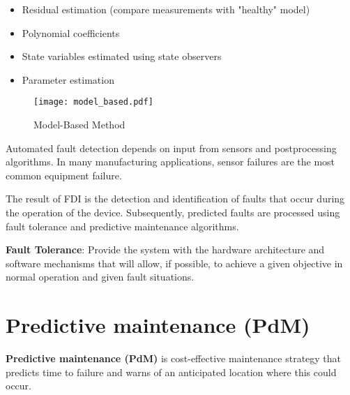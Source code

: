 \begin{itemize}
    \item Residual estimation (compare measurements with "healthy" model)
    \item Polynomial coefficients
    \item State variables estimated using state observers
    \item Parameter estimation
\end{itemize}

\begin{figure}[h!]
    \centering
    \texttt{[image: model\_based.pdf]}
    \caption{Model-Based Method}
    \label{fig:model_based}
\end{figure}


Automated fault detection depends on input from sensors and postprocessing
algorithms. In many manufacturing applications, sensor failures are the
most common equipment failure.


The result of FDI is the detection and identification of faults that occur
during the operation of the device. Subsequently, predicted faults are
processed using fault tolerance and predictive maintenance algorithms.

\textbf{Fault Tolerance}: Provide the system with the hardware architecture
and software mechanisms that will allow, if possible, to achieve a given
objective in normal operation and given fault situations.

%
%
%
%


% 


\section{Predictive maintenance (PdM)}
\textbf{Predictive maintenance (PdM)} is cost-effective maintenance strategy that
predicts time to failure and warns of an anticipated location where this
could occur.

